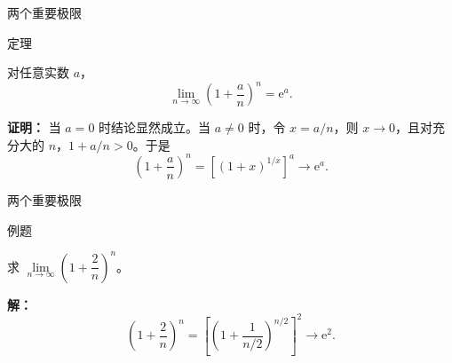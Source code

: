 \documentclass[aspectratio=169,10pt,fontset=fandol]{ctexbeamer}
\newcommand{\ee}{\mathrm{e}}
\begin{document}
\begin{frame}[t,fragile]{两个重要极限}
\footnotesize
\begin{block}{定理}
{\footnotesize

对任意实数 \(a\)，
\[
\lim_{n\to\infty}\left(1+\frac an\right)^n=\ee^a.
\]

}
\end{block}
\pause
{\footnotesize
\textbf{证明：}
当 \(a=0\) 时结论显然成立。当 \(a\neq0\) 时，令 \(x=a/n\)，则 \(x\to0\)，且对充分大的 \(n\)，\(1+a/n>0\)。于是
\[
\left(1+\frac an\right)^n
=\left[(1+x)^{1/x}\right]^a\longrightarrow\ee^a.
\]

}
\end{frame}
\begin{frame}[t,fragile]{两个重要极限}
\footnotesize
\begin{block}{例题}
{\footnotesize
求 \(\lim\limits_{n\to\infty} \left(1 + \dfrac{2}{n}\right)^n\)。

}
\end{block}
\pause
{\footnotesize
\textbf{解：}
\[
	\left(1 + \dfrac{2}{n}\right)^n = \left[\left(1 + \dfrac{1}{n/2}\right)^{n/2}\right]^2 \to \ee^2.
	\]

}
\end{frame}
\end{document}
